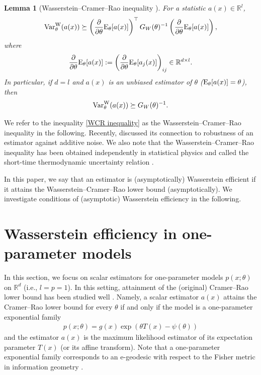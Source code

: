 \documentclass[11pt, a4paper]{article}
\newtheorem{lemma}{Lemma}
\begin{document}
\begin{lemma}[Wasserstein--Cramer--Rao inequality \citep{WIM}]
	For a statistic $a(x)\in\mathbb{R}^l$,
	\begin{align}\label{WCR inequality}
		{\rm Var}_{\theta}^{\mathrm{W}}(a(x)) \succeq \left( \frac{\partial}{\partial \theta} {\rm E}_{\theta}[a(x)]\right)^\top G_W(\theta)^{-1}\left(\frac{\partial}{\partial \theta} {\rm E}_{\theta}[a(x)]\right),
	\end{align}
	where 
	\begin{align*}
		\frac{\partial}{\partial \theta} {\rm E}_{\theta}[a(x)] := \left(\frac{\partial}{\partial \theta} {\rm E}_{\theta}[a_j(x)]\right)_{ij} \in \mathbb{R}^{d\times l}.
	\end{align*}
	In particular, if $d=l$ and $a(x)$ is an unbiased estimator of $\theta$ (${\rm E}_{\theta}[a(x)]=\theta$), then
	\begin{align*}
		{\rm Var}_{\theta}^{\mathrm{W}}(a(x)) \succeq G_W(\theta)^{-1}.
	\end{align*}
\end{lemma}

We refer to the inequality \eqref{WCR inequality} as the Wasserstein--Cramer--Rao inequality in the following.
Recently, \cite{affine} discussed its connection to robustness of an estimator against additive noise.
We also note that the Wasserstein--Cramer--Rao inequality has been obtained independently in statistical physics and called the short-time thermodynamic uncertainty relation \cite{dechant2022geometric,dechant2022geometric2,ito,otsubo2020estimating}.

In this paper, we say that an estimator is (asymptotically) Wasserstein efficient if it attains the Wasserstein--Cramer--Rao lower bound (asymptotically).
We investigate conditions of (asymptotic) Wasserstein efficiency in the following.

\section{Wasserstein efficiency in one-parameter models}\label{one-parameter}
In this section, we focus on scalar estimators for one-parameter models  $p(x; \theta)$ on $\mathbb{R}^d$ (i.e., $l=p=1$).
In this setting, attainment of the (original) Cramer--Rao lower bound has been studied well \cite{Fisher_efficiency,Fisher_efficiency2}.
Namely, a scalar estimator $a(x)$ attains the Cramer--Rao lower bound for every $\theta$ if and only if the model is a one-parameter exponential family 
\begin{align}\label{exp_family}
	p(x; \theta) = g(x) \exp (\theta T(x) - \psi(\theta))
\end{align}
and the estimator $a(x)$ is the maximum likelihood estimator of its expectation parameter $T(x)$ (or its affine transform).
Note that a one-parameter exponential family corresponds to an e-geodesic with respect to the Fisher metric in information geometry \cite{amari2000methods}.
\end{document}
